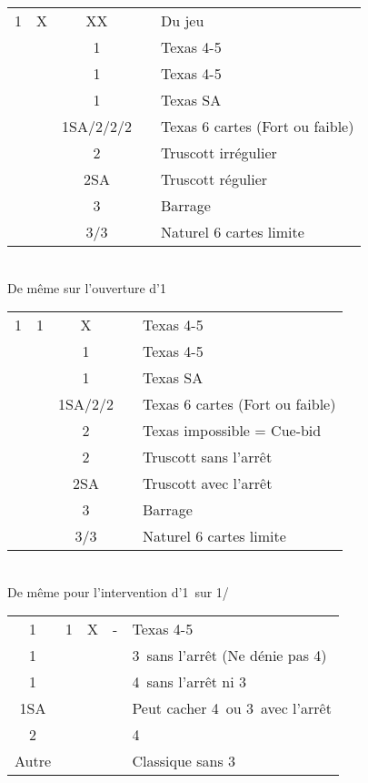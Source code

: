 \documentclass[a4paper, oneside, 11pt]{report}
\begin{document}
		\begin{tabular}{cccc|l}
		1\trefle & X & XX && Du jeu\\
		&& 1\carreau && Texas 4-5\coeur\\
		&& 1\coeur && Texas 4-5\pique\\
		&& 1\pique && Texas SA\\
		&& 1SA/2\trefle/2\carreau/2\coeur && Texas 6 cartes (Fort ou faible)\\
		&& 2\pique && Truscott irrégulier\\
		&& 2SA && Truscott régulier\\
		&& 3\trefle && Barrage\\
		&& 3\coeur/3\pique && Naturel 6 cartes limite\\
		\end{tabular}\\
		De même sur l'ouverture d'1\carreau\\

		\begin{tabular}{cccc|l}
		1\trefle & 1\carreau & X && Texas 4-5\coeur\\
		&& 1\coeur && Texas 4-5\pique\\
		&& 1\pique && Texas SA\\
		&& 1SA/2\carreau/2\coeur && Texas 6 cartes (Fort ou faible)\\
		&& 2\trefle && Texas impossible = Cue-bid\\
		&& 2\pique && Truscott sans l'arrêt \carreau\\
		&& 2SA && Truscott avec l'arrêt \carreau\\
		&& 3\trefle && Barrage\\
		&& 3\coeur/3\pique && Naturel 6 cartes limite\\
		\end{tabular}\\
		De même pour l'intervention d'1\coeur\ sur 1\trefle/\carreau\\

		\begin{tabular}{cccc|l}
		1\trefle & 1\carreau & X & - & Texas 4-5\coeur\\
		1\coeur &&&& 3\coeur\ sans l'arrêt (Ne dénie pas 4\pique)\\
		1\pique &&&& 4\pique\ sans l'arrêt ni 3\coeur\\
		1SA &&&& Peut cacher 4\pique\ ou 3\coeur\ avec l'arrêt \carreau\\
		2\coeur &&&& 4\coeur\\
		Autre &&&& Classique sans 3\coeur\\
		\end{tabular}\\\\
\end{document}
